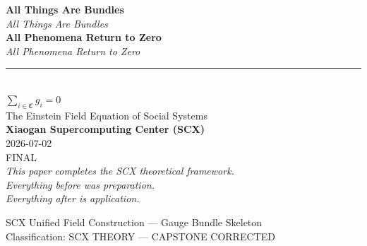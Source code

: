 \documentclass[12pt,a4paper]{article}
\theoremstyle{plain}
\theoremstyle{definition}
\newcommand{\ClaimSpace}{\mathfrak{C}}
\begin{document}
\newpage


\thispagestyle{empty}
\vspace*{3cm}

\begin{center}
{\Huge \textcolor{scxblue}{\textbf{All Things Are Bundles}}}\\[0.5cm]
{\Large \textit{All Things Are Bundles}}\\[1cm]

{\Huge \textcolor{scxblue}{\textbf{All Phenomena Return to Zero}}}\\[0.5cm]
{\Large \textit{All Phenomena Return to Zero}}\\[1cm]

\rule{0.5\textwidth}{1pt}\\[1cm]

{\large $\displaystyle\sum_{i \in \ClaimSpace} g_i = 0$}\\[0.5cm]

{\normalsize The Einstein Field Equation of Social Systems}\\[1.5cm]

{\normalsize \textbf{Xiaogan Supercomputing Center (SCX)}}\\[0.2cm]
{\small 2026-07-02}\\[0.2cm]
{\small FINAL}\\[0.5cm]

{\footnotesize
\textit{This paper completes the SCX theoretical framework.}\\[0.3cm]
\textit{Everything before was preparation.}\\
\textit{Everything after is application.}
}

\vspace{1cm}


\end{center}

\vfill

\begin{center}
{\small \textcolor{scxgray}{SCX Unified Field Construction — Gauge Bundle Skeleton}}\\
{\small \textcolor{scxgray}{Classification: SCX THEORY — CAPSTONE  CORRECTED}}
\end{center}
\end{document}
